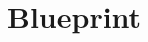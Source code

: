 \documentclass[12pt]{article}
\theoremstyle{definition}
\begin{document}
\section{Blueprint}
\end{document}
